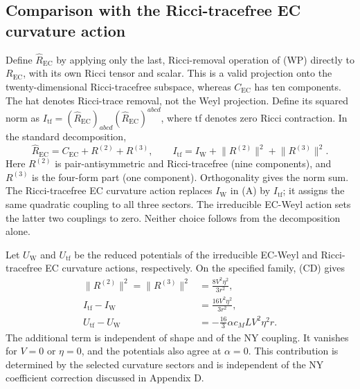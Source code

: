 \subsection{Comparison with the Ricci-tracefree EC curvature action}
\label{sec:ricci-tracefree}
Define $\widehat R_{\mathrm{EC}}$ by applying only the last, Ricci-removal operation of (WP)
directly to $R_{\mathrm{EC}}$, with its own Ricci tensor and scalar.
This is a valid projection onto the twenty-dimensional Ricci-tracefree
subspace, whereas $C_{\mathrm{EC}}$ has ten components. The hat denotes Ricci-trace removal, not the Weyl projection. Define its squared norm as $I_{\mathrm{tf}}=(\widehat R_{\mathrm{EC}})_{abcd}(\widehat R_{\mathrm{EC}})^{abcd}$, where tf denotes zero Ricci contraction. In the standard decomposition,
\begin{equation}
\widehat R_{\mathrm{EC}}=C_{\mathrm{EC}}+R^{(2)}+R^{(3)},\qquad
I_{\mathrm{tf}}=I_{\mathrm{W}}+\lVert R^{(2)}\rVert^2+\lVert R^{(3)}\rVert^2.
\tag{TF}\label{eq:TF}
\end{equation}
Here $R^{(2)}$ is pair-antisymmetric and Ricci-tracefree (nine components),
and $R^{(3)}$ is the four-form part (one component). Orthogonality gives the
norm sum. The Ricci-tracefree EC curvature action replaces $I_{\mathrm{W}}$ in (A) by $I_{\mathrm{tf}}$; it assigns the same
quadratic coupling to all three sectors. The irreducible EC-Weyl action sets the latter two
couplings to zero. Neither choice follows from the decomposition alone.

Let $U_{\mathrm{W}}$ and $U_{\mathrm{tf}}$ be the reduced potentials of the irreducible EC-Weyl and Ricci-tracefree EC curvature actions, respectively. On the specified family, (CD) gives
\begin{equation}
\begin{aligned}
\lVert R^{(2)}\rVert^2=\lVert R^{(3)}\rVert^2&=\frac{8V^2\eta^2}{3r^2},\\
I_{\mathrm{tf}}-I_{\mathrm{W}}&=\frac{16V^2\eta^2}{3r^2},\\
U_{\mathrm{tf}}-U_{\mathrm{W}}&=-\frac{16}{3}\alpha c_M L V^2\eta^2 r.
\end{aligned}\tag{SHIFT}\label{eq:SHIFT}
\end{equation}
The additional term is independent of shape and of the NY coupling. It
vanishes for $V=0$ or $\eta=0$, and the potentials also agree at $\alpha=0$.
This contribution is determined by the selected curvature sectors and is
independent of the NY coefficient correction discussed in Appendix D.

